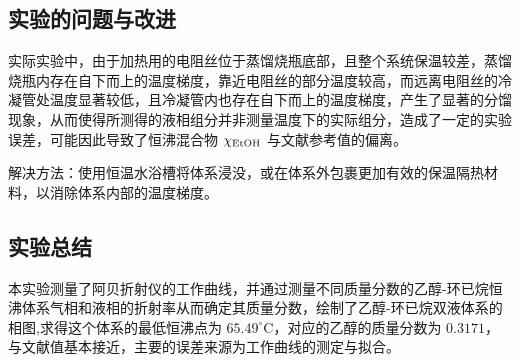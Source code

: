 \subsection{实验的问题与改进}

实际实验中，由于加热用的电阻丝位于蒸馏烧瓶底部，且整个系统保温较差，蒸馏烧瓶内存在自下而上的温度梯度，靠近电阻丝的部分温度较高，而远离电阻丝的冷凝管处温度显著较低，且冷凝管内也存在自下而上的温度梯度，产生了显著的分馏现象，从而使得所测得的液相组分并非测量温度下的实际组分，造成了一定的实验误差，可能因此导致了恒沸混合物 $\chi_{\rm{EtOH}}$ 与文献参考值的偏离。

解决方法：使用恒温水浴槽将体系浸没，或在体系外包裹更加有效的保温隔热材料，以消除体系内部的温度梯度\cite{song2020temperature}。

\subsection{实验总结}

本实验测量了阿贝折射仪的工作曲线，并通过测量不同质量分数的乙醇-环已烷恒沸体系气相和液相的折射率从而确定其质量分数，绘制了乙醇-环已烷双液体系的相图,求得这个体系的最低恒沸点为 $65.49^{\circ} \mathrm{C}$，对应的乙醇的质量分数为 $0.3171$，与文献值基本接近，主要的误差来源为工作曲线的测定与拟合。


